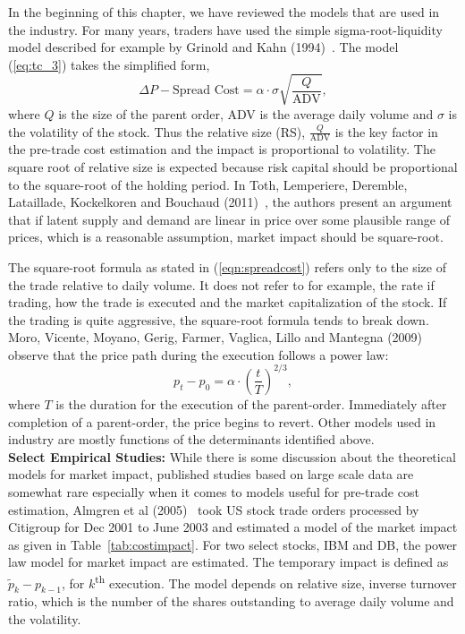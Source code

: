 In the beginning of this chapter, we have reviewed the models that are used in the industry. For many years, traders have used the simple sigma-root-liquidity model described for example by Grinold and Kahn (1994)~\cite{grin2000}. The model (\ref{eq:tc_3}) takes the simplified form,
	\begin{equation}\label{eqn:spreadcost}
	\Delta P - \text{Spread Cost} = \alpha \cdot \sigma \sqrt{\dfrac{Q}{\text{ADV}}},
	\end{equation}
where $Q$ is the size of the parent order, ADV is the average daily volume and $\sigma$ is the volatility of the stock. Thus the relative size (RS), $\frac{Q}{\text{ADV}}$ is the key factor in the pre-trade cost estimation and the impact is proportional to volatility. The square root of relative size is expected because risk capital should be proportional to the square-root of the holding period. In Toth, Lemperiere, Deremble, Lataillade, Kockelkoren and Bouchaud (2011)~\cite{toth2011anomalous}, the authors present an argument that if latent supply and demand are linear in price over some plausible range of prices, which is a reasonable assumption, market impact should be square-root.


The square-root formula as stated in (\ref{eqn:spreadcost}) refers only to the size of the trade relative to daily volume. It does not refer to for example, the rate if trading, how the trade is executed and the market capitalization of the stock. If the trading is quite aggressive, the square-root formula tends to break down. Moro, Vicente, Moyano, Gerig, Farmer, Vaglica, Lillo and Mantegna (2009)~\cite{moro2009market} observe that the price path during the execution follows a power law:
	\begin{equation}\label{eqn:ptalpha}
	p_t - p_0 = \alpha \cdot \left( {\frac{t}{T}} \right)^{2/3},
	\end{equation}
where $T$ is the duration for the execution of the parent-order. Immediately after completion of a parent-order, the price begins to revert. Other models used in industry are mostly functions of the determinants identified above. \\


\noindent\textbf{Select Empirical Studies:} While there is some discussion about the theoretical models for market impact, published studies based on large scale data are somewhat rare especially when it comes to models useful for pre-trade cost estimation, Almgren et al (2005)~\cite{athl} took US stock trade orders processed by Citigroup for Dec 2001 to June 2003 and estimated a model of the market impact as given in Table~\ref{tab:costimpact}. For two select stocks, IBM and DB, the power law model for market impact are estimated. The temporary impact is defined as $\widetilde{p}_k - p_{k-1}$, for $k$\textsuperscript{th} execution. The model depends on relative size, inverse turnover ratio, which is the number of the shares outstanding to average daily volume and the volatility.


